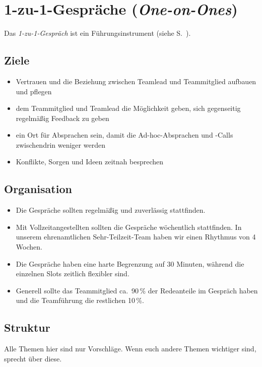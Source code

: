 \section{1-zu-1-Gespräche (\emph{One-on-Ones})}
\label{1-zu-1}

Das \emph{1-zu-1-Gespräch} ist ein Führungsinstrument (siehe S.~\pageref{fuehrungsinstrumente}).

\subsection{Ziele}

\begin{itemize}
    \item Vertrauen und die Beziehung zwischen Teamlead und Teammitglied aufbauen und pflegen
    \item dem Teammitglied und Teamlead die Möglichkeit geben, sich gegenseitig regelmäßig Feedback zu geben
    \item ein Ort für Absprachen sein, damit die Ad-hoc-Absprachen und -Calls zwischendrin weniger werden
    \item Konflikte, Sorgen und Ideen zeitnah besprechen
\end{itemize}

\subsection{Organisation}

\begin{itemize}
    \item Die Gespräche sollten regelmäßig und zuverlässig stattfinden.
    \item Mit Vollzeitangestellten sollten die Gespräche wöchentlich stattfinden. In unserem ehrenamtlichen Sehr-Teilzeit-Team haben wir einen Rhythmus von 4 Wochen.
    \item Die Gespräche haben eine harte Begrenzung auf 30 Minuten, während die einzelnen Slots zeitlich flexibler sind.
    \item Generell sollte das Teammitglied ca.~90\,\% der Redeanteile im Gespräch haben und die Teamführung die restlichen 10\,\%.
\end{itemize}

\subsection{Struktur}

Alle Themen hier sind nur Vorschläge. Wenn euch andere Themen wichtiger sind, sprecht über diese.

